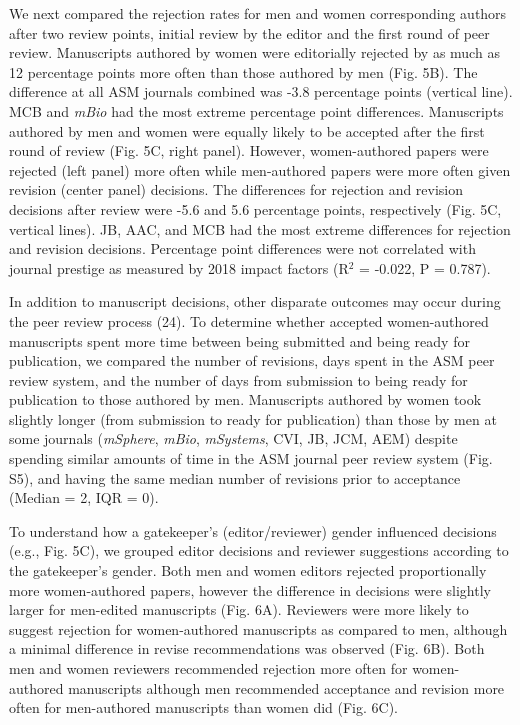 \documentclass[11pt,]{article}
\begin{document}
We next compared the rejection rates for men and women corresponding
authors after two review points, initial review by the editor and the
first round of peer review. Manuscripts authored by women were
editorially rejected by as much as 12 percentage points more often than
those authored by men (Fig. 5B). The difference at all ASM journals
combined was -3.8 percentage points (vertical line). MCB and \emph{mBio}
had the most extreme percentage point differences. Manuscripts authored
by men and women were equally likely to be accepted after the first
round of review (Fig. 5C, right panel). However, women-authored papers
were rejected (left panel) more often while men-authored papers were
more often given revision (center panel) decisions. The differences for
rejection and revision decisions after review were -5.6 and 5.6
percentage points, respectively (Fig. 5C, vertical lines). JB, AAC, and
MCB had the most extreme differences for rejection and revision
decisions. Percentage point differences were not correlated with journal
prestige as measured by 2018 impact factors (R\({^2}\) = -0.022, P =
0.787).

In addition to manuscript decisions, other disparate outcomes may occur
during the peer review process (24). To determine whether accepted
women-authored manuscripts spent more time between being submitted and
being ready for publication, we compared the number of revisions, days
spent in the ASM peer review system, and the number of days from
submission to being ready for publication to those authored by men.
Manuscripts authored by women took slightly longer (from submission to
ready for publication) than those by men at some journals
(\emph{mSphere}, \emph{mBio}, \emph{mSystems}, CVI, JB, JCM, AEM)
despite spending similar amounts of time in the ASM journal peer review
system (Fig. S5), and having the same median number of revisions prior
to acceptance (Median = 2, IQR = 0).

To understand how a gatekeeper's (editor/reviewer) gender influenced
decisions (e.g., Fig. 5C), we grouped editor decisions and reviewer
suggestions according to the gatekeeper's gender. Both men and women
editors rejected proportionally more women-authored papers, however the
difference in decisions were slightly larger for men-edited manuscripts
(Fig. 6A). Reviewers were more likely to suggest rejection for
women-authored manuscripts as compared to men, although a minimal
difference in revise recommendations was observed (Fig. 6B). Both men
and women reviewers recommended rejection more often for women-authored
manuscripts although men recommended acceptance and revision more often
for men-authored manuscripts than women did (Fig. 6C).
\end{document}
